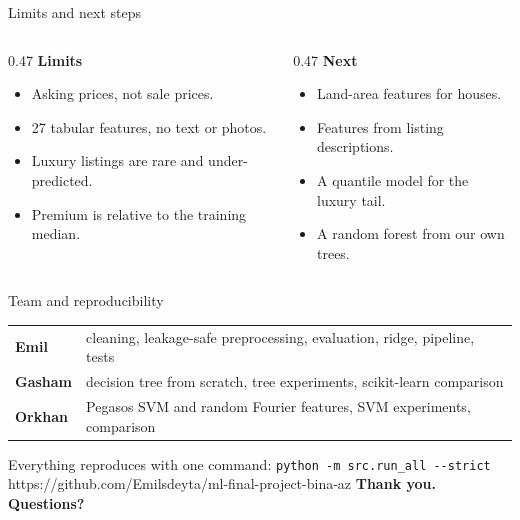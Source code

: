 \documentclass[aspectratio=169,11pt]{beamer}
\newcommand{\code}[1]{\texttt{\small #1}}
\begin{document}
\begin{frame}[t]{Limits and next steps}
  \begin{columns}[T,onlytextwidth]
    \begin{column}{0.47\textwidth}
      \vspace{0.5em}
      {\bfseries Limits}
      \begin{itemize}\setlength\itemsep{0.4em}\small
        \item Asking prices, not sale prices.
        \item 27 tabular features, no text or photos.
        \item Luxury listings are rare and under-predicted.
        \item Premium is relative to the training median.
      \end{itemize}
    \end{column}
    \begin{column}{0.47\textwidth}
      \vspace{0.5em}
      {\bfseries Next}
      \begin{itemize}\setlength\itemsep{0.4em}\small
        \item Land-area features for houses.
        \item Features from listing descriptions.
        \item A quantile model for the luxury tail.
        \item A random forest from our own trees.
      \end{itemize}
    \end{column}
  \end{columns}
\end{frame}

\begin{frame}[t]{Team and reproducibility}
  \vspace{0.5em}
  \begin{tabular}{@{}ll@{}}
    \textbf{Emil} & cleaning, leakage-safe preprocessing, evaluation, ridge, pipeline, tests\\[3pt]
    \textbf{Gasham} & decision tree from scratch, tree experiments, scikit-learn comparison\\[3pt]
    \textbf{Orkhan} & Pegasos SVM and random Fourier features, SVM experiments, comparison
  \end{tabular}
  \vspace{1.6em}

  Everything reproduces with one command: \code{python -m src.run\_all -{}-strict}\\[3pt]
  {\small\color{accent}https://github.com/Emilsdeyta/ml-final-project-bina-az}
  \vfill
  {\Large\bfseries Thank you. Questions?}
  \vspace{1cm}
\end{frame}
\end{document}
